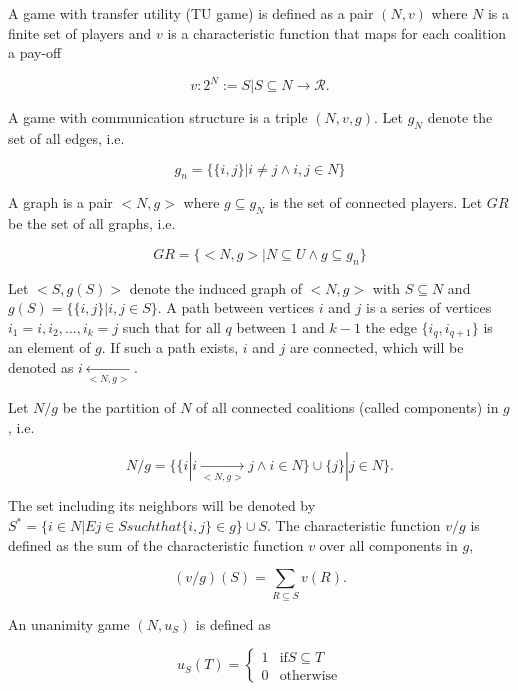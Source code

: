 \documentclass[twoside,twocolumn,9pt]{article}
\begin{document}
A game with transfer utility (TU game) is defined as a pair $(N, v)$ where $N$ is a finite
set of players and $v$ is a characteristic function that maps for each coalition a pay-off

\begin{equation}
	v: 2^N := {S | S \subseteq N} \rightarrow \mathcal{R}.
\end{equation}

A game with communication structure is a triple $(N, v, g)$.
Let $g_N$ denote the set of all edges, i.e.

\begin{equation}
	g_n  = \{\{ i, j \} | i \ne j \land i, j \in N \}
\end{equation}

A graph is a pair $<N, g>$ where $g \subseteq g_N$ is the set of connected players.
Let $GR$ be the set of all graphs, i.e.

\begin{equation}
	GR = \{ <N, g> | N \subseteq U \land g \subseteq g_n \}
\end{equation}

Let $<S, g(S)>$ denote the induced graph of $<N, g>$ with $S \subseteq N$ and $g(S) = \{\{i, j \} | i, j \in S\}$.
A path between vertices $i$ and $j$ is a series of vertices $i_1 = i, i_2, \dots, i_k = j$ such that for all $q$ between
$1$ and $k-1$ the edge $\{i_q, i_{q+1}\}$ is an element of $g$. If such a path exists, $i$ and $j$ are connected, which
will be denoted as $i \underset{<N, g>}{\leftarrow}$.

Let $N/g$ be the partition of $N$ of all connected coalitions (called components) in $g$, i.e.

\begin{equation}
	N/g = \{\{ i | i \underset{<N, g>}{\rightarrow} j \land i \in N \} \cup \{j\} | j \in N \}.
\end{equation}

The set including its neighbors will be denoted by $S^* = \{ i \in N | E j \in S such that \{i, j\} \in g\} \cup S$.
The characteristic function $v/g$ is defined as the sum of the characteristic function $v$ over all components in $g$,

\begin{equation}
	(v/g)(S) = \sum_{R \subseteq S} v(R).
\end{equation}

An unanimity game $(N, u_S)$ is defined as

\begin{equation}
	u_S(T) = \begin{cases}
		1 & \text{if} S \subseteq T \\
		0 & \text{otherwise}
	\end{cases}
\end{equation}
\end{document}
